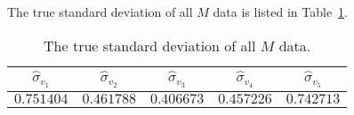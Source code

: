 \Answer{}
The true standard deviation of all $M$ data is listed in Table~\ref{tab:std}.

\begin{table}[H]
    \centering
    \caption{The true standard deviation of all $M$ data.}
    \label{tab:std}
    \begin{tabular}{@{}ccccc@{}}
        \toprule
        $\hat{\sigma}_{v_1}$ & $\hat{\sigma}_{v_2}$ & $\hat{\sigma}_{v_3}$ & $\hat{\sigma}_{v_4}$ & $\hat{\sigma}_{v_5}$ \\
        \midrule
        $0.751404$           & $0.461788$           & $0.406673$           & $0.457226$           & $0.742713$           \\
        \bottomrule
    \end{tabular}
\end{table}

